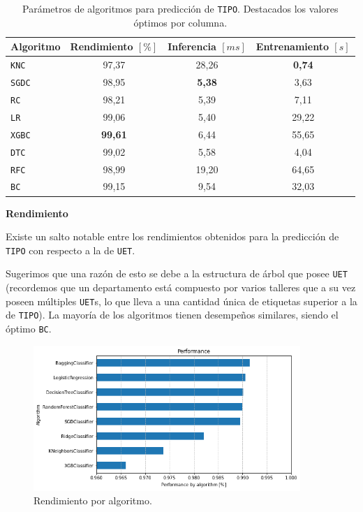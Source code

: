 \documentclass[a4paper,12pt]{article}
\begin{document}
		\begin{table}[H]
			\centering
			\begin{tabular}{lccc}
				\hline
				\multicolumn{1}{c}{\textbf{Algoritmo}} &
				\multicolumn{1}{c}{\textbf{Rendimiento $[\%]$}} &
				\multicolumn{1}{c}{\textbf{Inferencia $[ms]$}} &
				\multicolumn{1}{c}{\textbf{Entrenamiento $[s]$}} \\ 
				\hline
				\texttt{KNC}  & 97,37          & 28,26         & \textbf{0,74} \\
				\texttt{SGDC} & 98,95          & \textbf{5,38} & 3,63          \\
				\texttt{RC}   & 98,21          & 5,39          & 7,11          \\
				\texttt{LR}   & 99,06          & 5,40          & 29,22         \\
				\texttt{XGBC} & \textbf{99,61} & 6,44          & 55,65         \\
				\texttt{DTC}  & 99,02          & 5,58          & 4,04          \\
				\texttt{RFC}  & 98,99          & 19,20         & 64,65         \\
				\texttt{BC}   & 99,15          & 9,54          & 32,03         \\ 
				\hline
			\end{tabular}
			\caption{Parámetros de algoritmos para predicción de \texttt{TIPO}. Destacados los valores óptimos por columna.}
			\label{tab:tipo-parameters-algo}
		\end{table}		
						
		\clearpage				
						
		\textbf{Rendimiento}
						
		Existe un salto notable entre los rendimientos obtenidos para la predicción de \texttt{TIPO} con respecto a la de \texttt{UET}. 
				
		Sugerimos que una razón de esto se debe a la estructura de árbol que posee \texttt{UET} (recordemos que un departamento está compuesto por varios talleres que a su vez poseen múltiples \texttt{UET}s, lo que lleva a una cantidad única de etiquetas superior a la de \texttt{TIPO}). La mayoría de los algoritmos tienen desempeños similares, siendo el óptimo \texttt{BC}.
						
		\begin{figure}[H]
			\begin{center}
				\includegraphics[width=0.9\textwidth]{perfo_uet_by_algo.png}
				\caption{Rendimiento por algoritmo.}
				\label{fig:perfo_uet_by_algo}
			\end{center}
		\end{figure}
						
\end{document}

